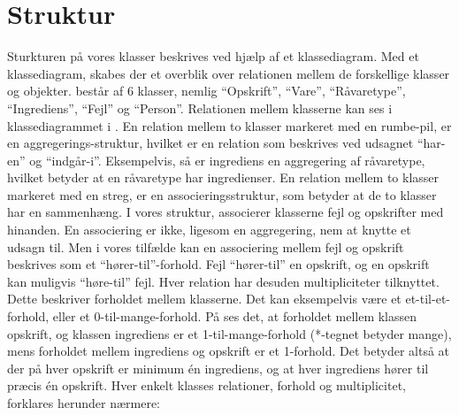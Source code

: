 \section{Struktur}
\label{sec:struktur}

Sturkturen på vores klasser beskrives ved hjælp af et klassediagram. Med et klassediagram, skabes der et overblik over relationen mellem de forskellige klasser og objekter. \Foodl{} består af 6 klasser, nemlig ``Opskrift'', ``Vare'', ``Råvaretype'', ``Ingrediens'', ``Fejl'' og ``Person''. Relationen mellem klasserne kan ses i klassediagrammet i . En relation mellem to klasser markeret med en rumbe-pil, er en aggregerings-struktur, hvilket er en relation som beskrives ved udsagnet ``har-en'' og ``indgår-i''. Eksempelvis, så er ingrediens en aggregering af råvaretype, hvilket betyder at en råvaretype har ingredienser. En relation mellem to klasser markeret med en streg, er en associeringsstruktur, som betyder at de to klasser har en sammenhæng. I vores struktur, associerer klasserne fejl og opskrifter med hinanden. En associering er ikke, ligesom en aggregering, nem at knytte et udsagn til. Men i vores tilfælde kan en associering mellem fejl og opskrift beskrives som et ``hører-til''-forhold. Fejl ``hører-til'' en opskrift, og en opskrift kan muligvis ``høre-til'' fejl. Hver relation har desuden multipliciteter tilknyttet. Dette beskriver forholdet mellem klasserne. Det kan eksempelvis være et et-til-et-forhold, eller et 0-til-mange-forhold. På  ses det, at forholdet mellem klassen opskrift, og klassen ingrediens er et 1-til-mange-forhold (*-tegnet betyder mange), mens forholdet mellem ingrediens og opskrift er et 1-forhold. Det betyder altså at der på hver opskrift er minimum én ingrediens, og at hver ingrediens hører til præcis én opskrift. Hver enkelt klasses relationer, forhold og multiplicitet, forklares herunder nærmere:




